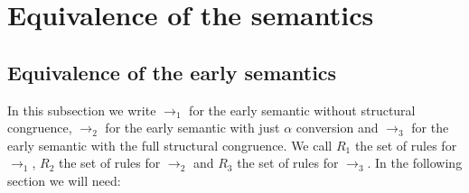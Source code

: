 \section{Equivalence of the semantics}
\subsection{Equivalence of the early semantics}
In this subsection we write $\rightarrow_{1}$ for the early semantic without structural congruence, $\rightarrow_{2}$ for the early semantic with just $\alpha$ conversion and $\rightarrow_{3}$ for the early semantic with the full structural congruence. We call $R_{1}$ the set of rules for $\rightarrow_{1}$, $R_{2}$ the set of rules for $\rightarrow_{2}$ and $R_{3}$ the set of rules for $\rightarrow_{3}$. 
In the following section we will need:

